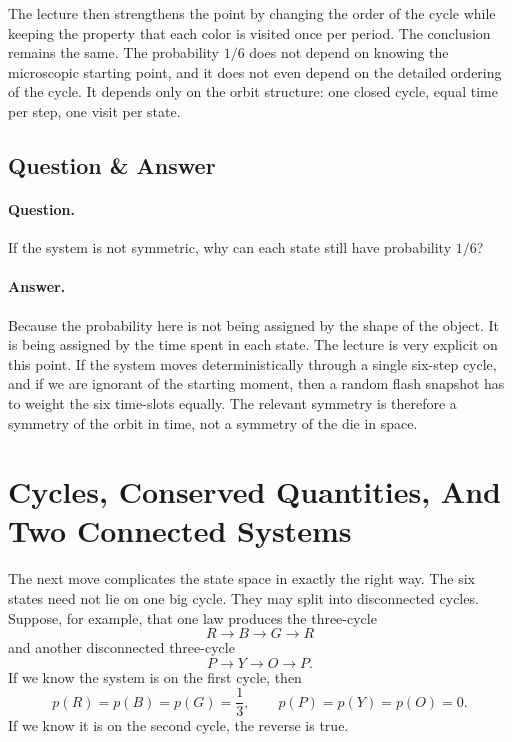The lecture then strengthens the point by changing the order of the cycle while keeping the property that each color is visited once per period. The conclusion remains the same. The probability \(1/6\) does not depend on knowing the microscopic starting point, and it does not even depend on the detailed ordering of the cycle. It depends only on the orbit structure: one closed cycle, equal time per step, one visit per state.

\subsection{Question \& Answer}

\paragraph{Question.} If the system is not symmetric, why can each state still have probability \(1/6\)?

\paragraph{Answer.} Because the probability here is not being assigned by the shape of the object. It is being assigned by the time spent in each state. The lecture is very explicit on this point. If the system moves deterministically through a single six-step cycle, and if we are ignorant of the starting moment, then a random flash snapshot has to weight the six time-slots equally. The relevant symmetry is therefore a symmetry of the orbit in time, not a symmetry of the die in space.

\section{Cycles, Conserved Quantities, And Two Connected Systems}

The next move complicates the state space in exactly the right way. The six states need not lie on one big cycle. They may split into disconnected cycles. Suppose, for example, that one law produces the three-cycle
\begin{equation}
R\to B\to G\to R
\end{equation}
and another disconnected three-cycle
\begin{equation}
P\to Y\to O\to P.
\end{equation}
If we know the system is on the first cycle, then
\begin{equation}
p(R)=p(B)=p(G)=\frac13,
\qquad
p(P)=p(Y)=p(O)=0.
\end{equation}
If we know it is on the second cycle, the reverse is true.

